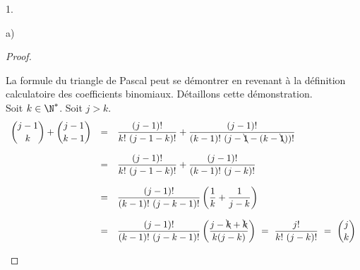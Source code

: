 \begin{noliste}{1.}
\begin{noliste}{a)}
    \begin{proof}~%
      \begin{remark}%
        La formule du triangle de Pascal peut se démontrer en revenant
        à la définition calculatoire des coefficients binomiaux.
        Détaillons cette démonstration.\\
        Soit $k\in\N^*$. Soit $j > k$.
        \[
        \begin{array}{rcl}
          \dbinom{j-1}{k} + \dbinom{j-1}{k-1} & = & 
          \dfrac{(j-1)!}{k! \ (j-1-k)!} + \dfrac{(j-1)!}{(k-1)! \
            (j-\bcancel{1}-(k-\bcancel{1}))!}
          \\[.6cm]
          & = & \dfrac{(j-1)!}{k! \ (j-1-k)!} + \dfrac{(j-1)!}{(k-1)! \
            (j-k)!}
          \\[.6cm]
          & = & \dfrac{(j-1)!}{(k-1)! \ (j-k-1)!} \left(
            \dfrac{1}{k} + \dfrac{1}{j-k}\right)
          \\[.6cm]
          & = & \dfrac{(j-1)!}{(k-1)! \ (j-k-1)!} \left(
            \dfrac{j-\bcancel{k}+\bcancel{k}}{k(j-k)}\right)
          \ = \ \dfrac{j!}{k! \ (j-k)!}
          \ = \ \dbinom{j}{k}
        \end{array}
        \]
      \end{remark}
	

      \newpage



\end{proof}
\end{noliste}
\end{noliste}
